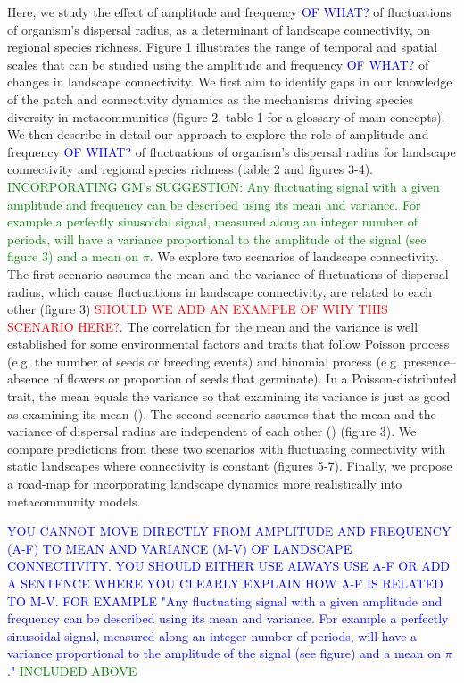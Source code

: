 \documentclass[12pt]{article}
\newcommand{\carlos}[1]{\textcolor{Red}{#1}}
\newcommand{\GM}[1]{\textcolor{Blue}{#1}}
\newcommand{\JK}[1]{\textcolor{Green}{#1}}
\begin{document}
Here, we study the effect of amplitude and frequency \GM{OF WHAT?} of fluctuations of organism's dispersal radius, as a determinant of landscape connectivity, on regional species richness. Figure 1 illustrates the range of temporal and spatial scales that can be studied using the amplitude and frequency \GM{OF WHAT?} of changes in landscape connectivity. We first aim to identify gaps in our knowledge of the patch and connectivity dynamics as the mechanisms driving species diversity in metacommunities (figure 2, table 1 for a glossary of main concepts). We then describe in detail our approach to explore the role of amplitude and frequency \GM{OF WHAT?} of fluctuations of organism's dispersal radius for landscape connectivity and regional species richness (table 2 and figures 3-4). \JK{INCORPORATING GM's SUGGESTION: Any fluctuating signal with a given amplitude and frequency can be described using its mean and variance. For example a perfectly sinusoidal signal, measured along an integer number of periods, will have a variance proportional to the amplitude of the signal (see figure 3) and a mean on $\pi$.} We explore two scenarios of landscape connectivity. The first scenario assumes the mean and the variance of fluctuations of dispersal radius, which cause fluctuations in landscape connectivity, are related to each other (figure 3) \carlos{SHOULD WE ADD AN EXAMPLE OF WHY THIS SCENARIO HERE?}. The correlation for the mean and the variance is well established for some environmental factors and traits that follow Poisson process (e.g. the number of seeds or breeding events) and binomial process (e.g. presence--absence of flowers or proportion of seeds that germinate). In a Poisson-distributed trait, the mean equals the variance so that examining its variance is just as good as examining its mean (\cite{Nakagawal&Schielzeth2012}). The second scenario assumes that the mean and the variance of dispersal radius are independent of each other (\cite{Violletal2012}) (figure 3). We compare predictions from these two scenarios with fluctuating connectivity with static landscapes where connectivity is constant (figures 5-7). Finally, we propose a road-map for incorporating landscape dynamics more realistically into metacommunity models.


\GM{YOU CANNOT MOVE DIRECTLY FROM AMPLITUDE AND FREQUENCY (A-F) TO MEAN AND VARIANCE (M-V) OF LANDSCAPE CONNECTIVITY. YOU SHOULD EITHER USE ALWAYS USE A-F OR ADD A SENTENCE WHERE YOU CLEARLY EXPLAIN HOW A-F IS RELATED TO M-V. FOR EXAMPLE "Any fluctuating signal with a given amplitude and frequency can be described using its mean and variance. For example a perfectly sinusoidal signal, measured along an integer number of periods, will have a variance proportional to the amplitude of the signal (see figure) and a mean on $\pi$."}  \JK{INCLUDED ABOVE}
\end{document}
